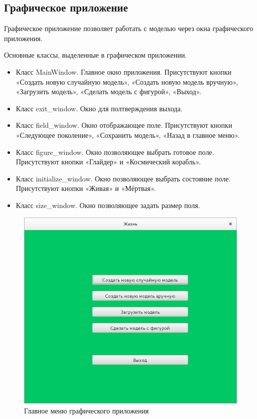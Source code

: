 \documentclass[a4paper]{article}
\begin{document}
\subsection{Графическое приложение}
Графическое приложение позволяет работать с моделью через окна графического приложения.

\noindent Основные классы, выделенные в графическом приложении. 
\begin{itemize}
\item Класс MainWindow. Главное окно приложения. Присутствуют кнопки «Создать новую случайную модель», «Создать новую модель вручную», «Загрузить модель», «Сделать модель с фигурой», «Выход».
\item Класс exit\_window. Окно для полтверждения выхода.
\item Класс field\_window. Окно отображающее поле. Присутствуют кнопки «Следующее поколение», «Сохранить модель», «Назад в главное меню».
\item Класс figure\_window. Окно позволяющее выбрать готовое поле. Присутствуют кнопки «Глайдер» и «Космический корабль».
\item Класс initialize\_window. Окно позволяющее выбрать состояние поле. Присутствуют кнопки «Живая» и «Мёртвая».
\item Класс size\_window. Окно позволяющее задать размер поля.
\end{itemize}

\begin{figure}[H]
	\begin{center}
		\includegraphics[scale=0.5]{gui}
		\caption{Главное меню графического приложения} 
		\label{pic:graphicsMeinMenu} %
	\end{center}
\end{figure}
\end{document}
